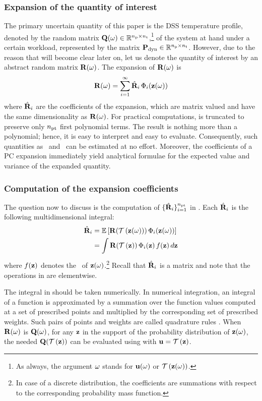 \subsubsection{Expansion of the quantity of interest}
The primary uncertain quantity of this paper is the DSS temperature profile, denoted by the random matrix $\mathbf{Q}(\omega) \in \mathbb{R}^{{n_\text{p}} \times {n_\text{t}}}$,\footnote{As always, the argument $\omega$ stands for $\mathbf{u}(\omega)$ or $\oTransform{\vZ(\o)}$.} of the system at hand under a certain workload, represented by the matrix $\mathbf{P}_{\text{dyn}} \in \mathbb{R}^{{n_\text{p}} \times {n_\text{t}}}$.
However, due to the reason that will become clear later on, let us denote the quantity of interest by an abstract random matrix $\mathbf{R}(\omega)$.
The expansion of $\mathbf{R}(\omega)$ is
\begin{equation} \elabel{polynomial-chaos-expansion}
  \mR(\o) = \sum_{i = 1}^\infty \pcc{\mR}_i \, \pcb_i(\vZ(\o))
\end{equation}
where $\hat{\mathbf{R}}_i$ are the coefficients of the expansion, which are matrix valued and have the same dimensionality as $\mathbf{R}(\omega)$.
For practical computations,  is truncated to preserve only ${n_\text{pt}}$ first polynomial terms.
The result is nothing more than a polynomial; hence, it is easy to interpret and easy to evaluate.
Consequently, such quantities as \cdfs\ and \pdfs\ can be estimated at no effort.
Moreover, the coefficients of a PC expansion immediately yield analytical formulae for the expected value and variance of the expanded quantity.

\subsubsection{Computation of the expansion coefficients}
The question now to discuss is the computation of $\{ \hat{\mathbf{R}}_i \}_{i = 1}^{n_\text{pt}}$ in .
Each $\hat{\mathbf{R}}_i$ is the following multidimensional integral:
\begin{align}
  \pcc{\mR}_i & = \oExpectation{\mR(\oTransform{\vZ(\o)}) \, \pcb_i(\vZ(\o))} \nonumber \\
  & = \int \mR(\oTransform{\vZ}) \, \pcb_i(\vZ) \, \fPDF(\vZ) \, \d\vZ \elabel{polynomial-chaos-coefficients}
\end{align}
where $f(\mathbf{z})$ denotes the \pdf\ of $\mathbf{z}(\omega)$.\footnote{In case of a discrete distribution, the coefficients are summations with respect to the corresponding probability mass function.}
Recall that $\hat{\mathbf{R}}_i$ is a matrix and note that the operations in  are elementwise.

The integral in  should be taken numerically.
In numerical integration, an integral of a function is approximated by a summation over the function values computed at a set of prescribed points and multiplied by the corresponding set of prescribed weights.
Such pairs of points and weights are called quadrature rules \cite{press2007}.
When $\mathbf{R}(\omega)$ is $\mathbf{Q}(\omega)$, for any $\mathbf{z}$ in the support of the probability distribution of $\mathbf{z}(\omega)$, the needed $\mQ(\oTransform{\vZ})$ can be evaluated using  with $\vU = \oTransform{\vZ}$.
